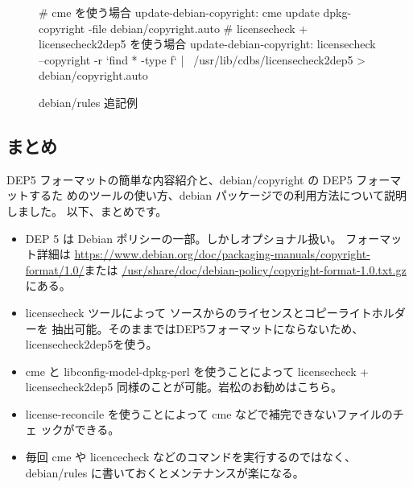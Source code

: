 \documentclass[mingoth,a4paper]{jsarticle}
\begin{document}
\begin{figure}[htbp]
\begin{center}
\begin{commandline}
# cme を使う場合
update-debian-copyright:
	cme update dpkg-copyright -file debian/copyright.auto
# licensecheck + licensecheck2dep5 を使う場合
update-debian-copyright:
        licensecheck --copyright -r `find * -type f` | \
                /usr/lib/cdbs/licensecheck2dep5 > debian/copyright.auto
\end{commandline}
\end{center}
\caption{debian/rules 追記例}
\label{fig:example-update-rules}
\end{figure}

\subsection{まとめ}

DEP5 フォーマットの簡単な内容紹介と、debian/copyright の DEP5 フォーマットするた
めのツールの使い方、debian パッケージでの利用方法について説明しました。
以下、まとめです。
\begin{itemize}
\item DEP 5 は Debian ポリシーの一部。しかしオプショナル扱い。
フォーマット詳細は
\url{https://www.debian.org/doc/packaging-manuals/copyright-format/1.0/}または
\url{/usr/share/doc/debian-policy/copyright-format-1.0.txt.gz}にある。

\item licensecheck ツールによって ソースからのライセンスとコピーライトホルダーを
抽出可能。そのままではDEP5フォーマットにならないため、licensecheck2dep5を使う。
\item cme と libconfig-model-dpkg-perl を使うことによって licensecheck +
licensecheck2dep5 同様のことが可能。岩松のお勧めはこちら。
\item license-reconcile を使うことによって cme などで補完できないファイルのチェ
ックができる。
\item 毎回 cme や licencecheck などのコマンドを実行するのではなく、debian/rules
に書いておくとメンテナンスが楽になる。
\end{itemize}


\dancersection{Debian Trivia Quiz}{}
\end{document}
